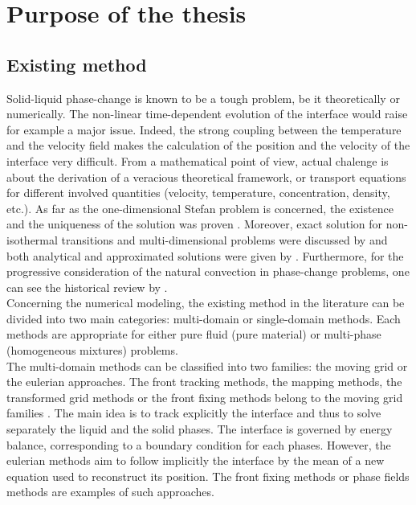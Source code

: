 \section{Purpose of the thesis}
\subsection{Existing method}
Solid-liquid phase-change is known to be a tough problem, be it theoretically or numerically.
The non-linear time-dependent evolution of the interface would raise for example a major issue.
Indeed, the strong coupling between the temperature and the velocity field makes the calculation of the position and the velocity of the interface very difficult.
From a mathematical point of view, actual chalenge is about the derivation of a veracious theoretical framework, or transport equations for different involved quantities (velocity, temperature, concentration, density, etc.).
As far as the one-dimensional Stefan problem is concerned, the existence and the uniqueness of the solution was proven \citep{rubinstein1947solution,evans1951note,douglas1957uniqueness}.
Moreover, exact solution for non-isothermal transitions and multi-dimensional problems were discussed by \citep{elliott1987error,cho1969heat} and both analytical and approximated solutions were given by \citep{tarzia2011explicit}. 
Furthermore, for the progressive consideration of the natural convection in phase-change problems, one can see the historical review by \citep{yao1989melting}. \\
Concerning the numerical modeling, the existing method in the literature can be divided into two main categories:
multi-domain or single-domain methods.
Each methods are appropriate for either pure fluid (pure material) or multi-phase (homogeneous mixtures) problems. \\
The multi-domain methods can be classified into two families:
the moving grid or the eulerian approaches. 
The front tracking methods, the mapping methods, the transformed grid methods or the front fixing methods belong to the moving grid families \citep{sparrow1977analysis,gupta2000moving}.
The main idea is to track explicitly the interface and thus to solve separately the liquid and the solid phases.
The interface is governed by energy balance, corresponding to a boundary condition for each phases. 
However, the eulerian methods aim to follow implicitly the interface by the mean of a new equation used to reconstruct its position.
The front fixing methods or phase fields methods are examples of such approaches.
